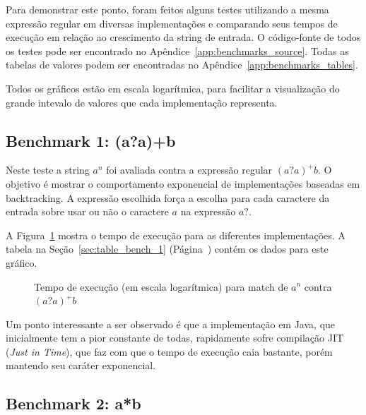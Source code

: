 \documentclass[a4paper,12pt,oneside,onecolumn]{uerj}
\begin{document}
Para demonstrar este ponto, foram feitos alguns testes utilizando a mesma expressão regular em diversas implementações e comparando seus tempos de execução em relação ao crescimento da string de entrada. O código-fonte de todos os testes pode ser encontrado no Apêndice~\ref{app:benchmarks_source}. Todas as tabelas de valores podem ser encontradas no Apêndice~\ref{app:benchmarks_tables}.

Todos os gráficos estão em escala logarítmica, para facilitar a visualização do grande intevalo de valores que cada implementação representa.

\subsection{Benchmark 1: (a?a)+b}

Neste teste a string $a^n$ foi avaliada contra a expressão regular $(a?a)^+b$. O objetivo é mostrar o comportamento exponencial de implementações baseadas em backtracking. A expressão escolhida força a escolha para cada caractere da entrada sobre usar ou não o caractere $a$ na expressão $a?$. 

A Figura~\ref{fig:graph_bench_1} mostra o tempo de execução para as diferentes implementações. A tabela na Seção~\ref{sec:table_bench_1} (Página~\pageref{sec:table_bench_1}) contém os dados para este gráfico.

\begin{figure}[!htbp]
\centering
{}
\caption{Tempo de execução (em escala logarítmica) para match de $a^n$ contra $(a?a)^+b$}
\label{fig:graph_bench_1}
\end{figure}

Um ponto interessante a ser observado é que a implementação em Java, que inicialmente tem a pior constante de todas, rapidamente sofre compilação JIT (\emph{Just in Time}), que faz com que o tempo de execução caia bastante, porém mantendo seu caráter exponencial.

\subsection{Benchmark 2: a*b}
\end{document}
